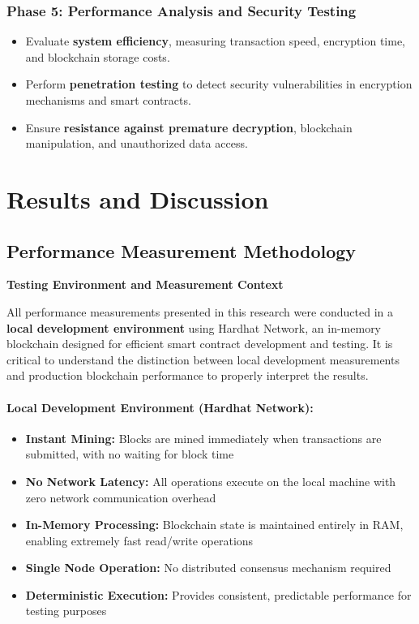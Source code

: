 \documentclass[12pt,a4paper]{article}
\begin{document}
\subsubsection{Phase 5: Performance Analysis and Security Testing}
\begin{itemize}
    \item Evaluate \textbf{system efficiency}, measuring transaction speed, encryption time, and blockchain storage costs.
    \item Perform \textbf{penetration testing} to detect security vulnerabilities in encryption mechanisms and smart contracts.
    \item Ensure \textbf{resistance against premature decryption}, blockchain manipulation, and unauthorized data access.
\end{itemize}


\newpage
\section{Results and Discussion}

\subsection{Performance Measurement Methodology}

\textbf{Testing Environment and Measurement Context}

All performance measurements presented in this research were conducted in a \textbf{local development environment} using Hardhat Network, an in-memory blockchain designed for efficient smart contract development and testing. It is critical to understand the distinction between local development measurements and production blockchain performance to properly interpret the results.

\paragraph{Local Development Environment (Hardhat Network):}
\begin{itemize}
    \item \textbf{Instant Mining:} Blocks are mined immediately when transactions are submitted, with no waiting for block time
    \item \textbf{No Network Latency:} All operations execute on the local machine with zero network communication overhead
    \item \textbf{In-Memory Processing:} Blockchain state is maintained entirely in RAM, enabling extremely fast read/write operations
    \item \textbf{Single Node Operation:} No distributed consensus mechanism required
    \item \textbf{Deterministic Execution:} Provides consistent, predictable performance for testing purposes
\end{itemize}
\end{document}
